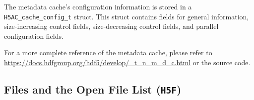The metadata cache's configuration information is stored in a \texttt{H5AC\_cache\_config\_t} struct. This struct contains fields for general information, size-increasing control fields, size-decreasing control fields, and parallel configuration fields.

For a more complete reference of the metadata cache, please refer to \url{https://docs.hdfgroup.org/hdf5/develop/_t_n_m_d_c.html} or the source code.

\subsection{Files and the Open File List (\texttt{H5F})}



